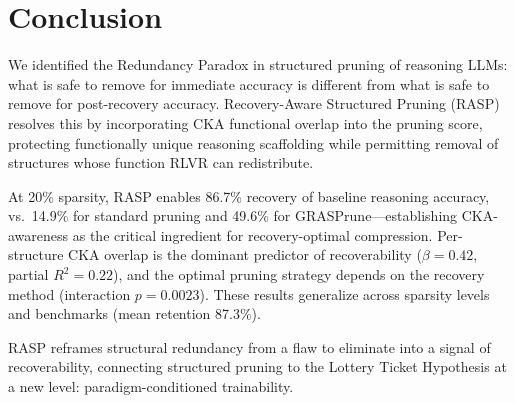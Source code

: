 \documentclass[11pt]{article}
\begin{document}
\section{Conclusion}
\label{sec:conclusion}

We identified the Redundancy Paradox in structured pruning of reasoning LLMs: what is safe to remove for immediate accuracy is different from what is safe to remove for post-recovery accuracy.
Recovery-Aware Structured Pruning (RASP) resolves this by incorporating CKA functional overlap into the pruning score, protecting functionally unique reasoning scaffolding while permitting removal of structures whose function RLVR can redistribute.

At 20\% sparsity, RASP enables 86.7\% recovery of baseline reasoning accuracy, vs.\ 14.9\% for standard pruning and 49.6\% for GRASPrune---establishing CKA-awareness as the critical ingredient for recovery-optimal compression.
Per-structure CKA overlap is the dominant predictor of recoverability ($\beta = 0.42$, partial $R^2 = 0.22$), and the optimal pruning strategy depends on the recovery method (interaction $p = 0.0023$).
These results generalize across sparsity levels and benchmarks (mean retention 87.3\%).

RASP reframes structural redundancy from a flaw to eliminate into a signal of recoverability, connecting structured pruning to the Lottery Ticket Hypothesis at a new level: paradigm-conditioned trainability.



\end{document}
